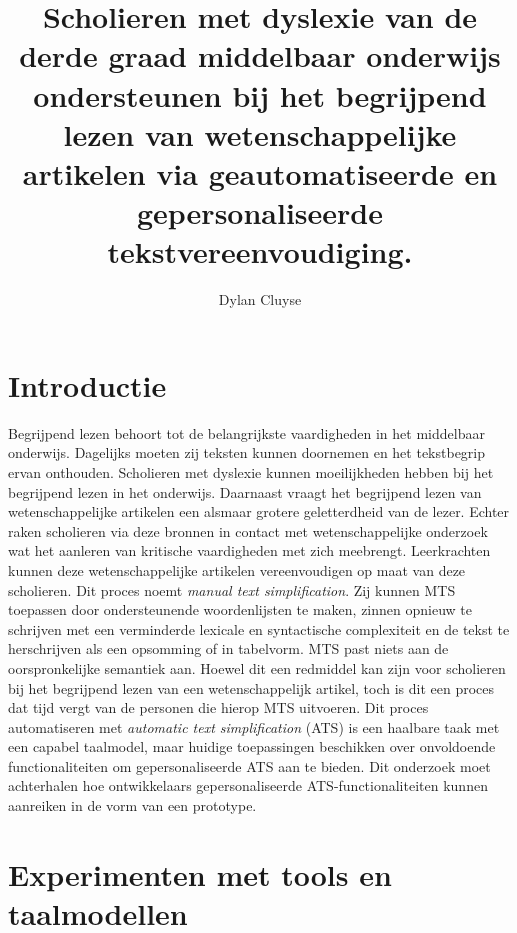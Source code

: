 \documentclass[a0,portrait]{hogent-poster}
\title{Scholieren met dyslexie van de derde graad middelbaar onderwijs ondersteunen bij het begrijpend lezen van wetenschappelijke artikelen via geautomatiseerde en gepersonaliseerde tekstvereenvoudiging.}
\subtitle{}
\author{Dylan Cluyse}
\begin{document}
\maketitle

\begin{abstract}

\end{abstract}

\begin{multicols}{2} %

\section{Introductie}

Begrijpend lezen behoort tot de belangrijkste vaardigheden in het middelbaar onderwijs. Dagelijks moeten zij teksten kunnen doornemen en het tekstbegrip ervan onthouden. Scholieren met dyslexie kunnen moeilijkheden hebben bij het begrijpend lezen in het onderwijs. Daarnaast vraagt het begrijpend lezen van wetenschappelijke artikelen een alsmaar grotere geletterdheid van de lezer. Echter raken scholieren via deze bronnen in contact met wetenschappelijke onderzoek wat het aanleren van kritische vaardigheden met zich meebrengt. Leerkrachten kunnen deze wetenschappelijke artikelen vereenvoudigen op maat van deze scholieren. Dit proces noemt \textit{manual text simplification}. Zij kunnen MTS toepassen door ondersteunende woordenlijsten te maken, zinnen opnieuw te schrijven met een verminderde lexicale en syntactische complexiteit en de tekst te herschrijven als een opsomming of in tabelvorm. MTS past niets aan de oorspronkelijke semantiek aan. Hoewel dit een redmiddel kan zijn voor scholieren bij het begrijpend lezen van een wetenschappelijk artikel, toch is dit een proces dat tijd vergt van de personen die hierop MTS uitvoeren. Dit proces automatiseren met \textit{automatic text simplification} (ATS) is een haalbare taak met een capabel taalmodel, maar huidige toepassingen beschikken over onvoldoende functionaliteiten om gepersonaliseerde ATS aan te bieden. Dit onderzoek moet achterhalen hoe ontwikkelaars gepersonaliseerde ATS-functionaliteiten kunnen aanreiken in de vorm van een prototype.



\section{Experimenten met tools en taalmodellen}


\end{multicols}
\end{document}
